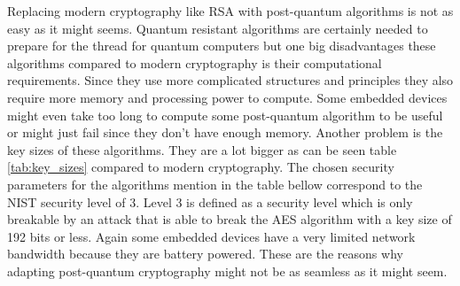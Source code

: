 Replacing modern cryptography like RSA with post-quantum algorithms is not as easy as it might seems. Quantum resistant algorithms are certainly needed to prepare for the thread for quantum computers but one big disadvantages these algorithms compared to modern cryptography is their computational requirements. Since they use more complicated structures and principles they also require more memory and processing power to compute. Some embedded devices might even take too long to compute some post-quantum algorithm to be useful or might just fail since they don't have enough memory. Another problem is the key sizes of these algorithms. They are a lot bigger as can be seen table \ref{tab:key_sizes} compared to modern cryptography. The chosen security parameters for the algorithms mention in the table bellow correspond to the NIST security level of 3. Level 3 is defined as a security level which is only breakable by an attack that is able to break the AES algorithm with a key size of 192 bits or less\cite{8lV5dQrQyshiCp3i}.  Again some embedded devices have a very limited network bandwidth  because they are battery powered. These are the reasons why adapting post-quantum cryptography might not be as seamless as it might seem.

